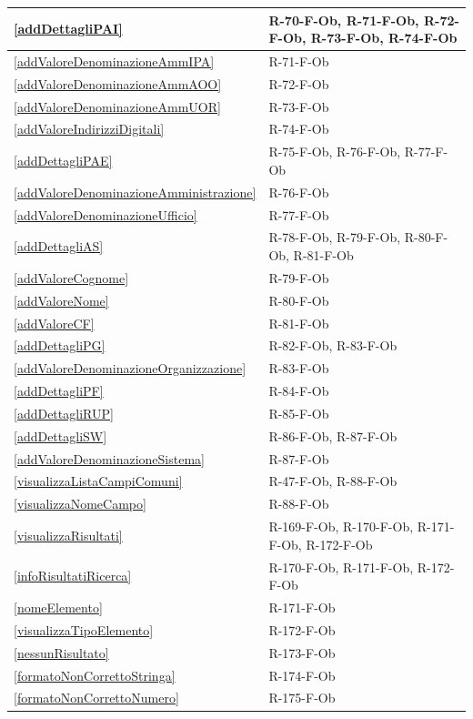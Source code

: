 \begin{longtable}{|p{4cm}|p{10cm}|}
\hline
\ref{addDettagliPAI} & R-70-F-Ob, R-71-F-Ob, R-72-F-Ob, R-73-F-Ob, R-74-F-Ob \\
\hline
\ref{addValoreDenominazioneAmmIPA} & R-71-F-Ob \\
\hline
\ref{addValoreDenominazioneAmmAOO} & R-72-F-Ob \\
\hline
\ref{addValoreDenominazioneAmmUOR} & R-73-F-Ob \\
\hline
\ref{addValoreIndirizziDigitali} & R-74-F-Ob \\
\hline
\ref{addDettagliPAE} & R-75-F-Ob, R-76-F-Ob, R-77-F-Ob \\
\hline
\ref{addValoreDenominazioneAmministrazione} & R-76-F-Ob \\
\hline
\ref{addValoreDenominazioneUfficio} & R-77-F-Ob \\
\hline
\ref{addDettagliAS} & R-78-F-Ob, R-79-F-Ob, R-80-F-Ob, R-81-F-Ob \\
\hline
\ref{addValoreCognome} & R-79-F-Ob \\
\hline
\ref{addValoreNome} & R-80-F-Ob \\
\hline
\ref{addValoreCF} & R-81-F-Ob \\
\hline
\ref{addDettagliPG} & R-82-F-Ob, R-83-F-Ob \\
\hline
\ref{addValoreDenominazioneOrganizzazione} & R-83-F-Ob \\
\hline
\ref{addDettagliPF} & R-84-F-Ob \\
\hline
\ref{addDettagliRUP} & R-85-F-Ob \\
\hline
\ref{addDettagliSW} & R-86-F-Ob, R-87-F-Ob \\
\hline
\ref{addValoreDenominazioneSistema} & R-87-F-Ob \\
\hline
\ref{visualizzaListaCampiComuni} & R-47-F-Ob, R-88-F-Ob \\
\hline
\ref{visualizzaNomeCampo} & R-88-F-Ob \\
\hline
\ref{visualizzaRisultati} & R-169-F-Ob, R-170-F-Ob, R-171-F-Ob, R-172-F-Ob \\
\hline
\ref{infoRisultatiRicerca} & R-170-F-Ob, R-171-F-Ob, R-172-F-Ob \\
\hline
\ref{nomeElemento} & R-171-F-Ob \\
\hline
\ref{visualizzaTipoElemento} & R-172-F-Ob \\
\hline
\ref{nessunRisultato} & R-173-F-Ob \\
\hline
\ref{formatoNonCorrettoStringa} & R-174-F-Ob \\
\hline
\ref{formatoNonCorrettoNumero} & R-175-F-Ob \\

\end{longtable}
